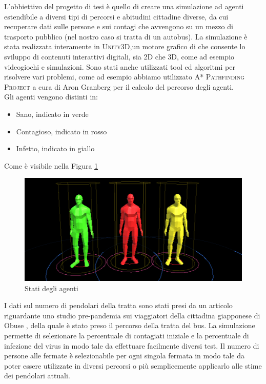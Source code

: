 \documentclass[12pt, openany]{book}
\begin{document}
		L'obbiettivo del progetto di tesi è quello di creare una simulazione ad agenti estendibile a diversi tipi di percorsi e abitudini cittadine diverse, da cui recuperare dati sulle persone e sui contagi che avvengono su un mezzo di trasporto pubblico (nel nostro caso si tratta di un autobus). La simulazione è stata realizzata interamente in \textsc{Unity3D},un motore grafico di che consente lo sviluppo di contenuti interattivi digitali, sia 2D che 3D, come ad esempio videogiochi e simulazioni. Sono stati anche utilizzati tool ed algoritmi per risolvere  vari problemi, come ad esempio abbiamo utilizzato \textsc{A* Pathfinding Project} a cura di Aron Granberg per il calcolo del percorso degli agenti. 
		\\Gli agenti vengono distinti in:
		\begin{itemize}
			\item Sano, indicato in verde
			\item Contagioso, indicato in rosso
			\item Infetto, indicato in giallo
			
		\end{itemize} 
		Come è visibile nella Figura \ref{fig:agenti}
	\begin{figure}[H]
		\centering
		\includegraphics[width=1\linewidth]{"Immagini/Agenti"}
		\caption{Stati degli agenti}
		\label{fig:agenti}
	\end{figure}		
		I dati sul numero di pendolari della tratta sono stati presi da un articolo riguardante uno studio pre-pandemia sui viaggiatori della cittadina giapponese di Obuse \cite{Obuse}, della quale è stato preso il percorso della tratta del bus. La simulazione permette di selezionare la percentuale di contagiati iniziale e la percentuale di infezione del virus in modo tale da effettuare facilmente diversi test. Il numero di persone alle fermate è selezionabile per ogni singola fermata in modo tale da poter essere utilizzate in diversi percorsi o più semplicemente applicarlo alle stime dei pendolari attuali.\\
\end{document}
